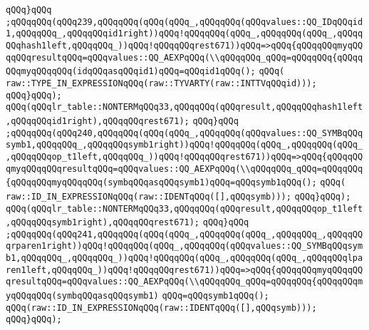\verb|qQQq}qQQq|\newline
\verb|;qQQqqQQq(qQQq239,qQQqqQQq(qQQq(qQQq_,qQQqqQQq(qQQqvalues::QQ_IDqQQqid1,qQQqqQQq_,qQQqqQQqid1right))qQQq!qQQqqQQq(qQQq_,qQQqqQQq(qQQq_,qQQqqQQqhash1left,qQQqqQQq_))qQQq!qQQqqQQqrest671))qQQq=>qQQq{qQQqqQQqmyqQQqqQQqresultqQQq=qQQqvalues::QQ_AEXPqQQq(\\qQQqqQQq_qQQq=qQQqqQQq{qQQqqQQqmyqQQqqQQq(idqQQqasqQQqid1)qQQq=qQQqid1qQQq();|\newline
\verb|qQQq(|\newline
\verb|raw::TYPE_IN_EXPRESSIONqQQq(raw::TYVARTY(raw::INTTVqQQqid)));|\newline
\verb|qQQq}qQQq);|\newline
\verb|qQQq(qQQqlr_table::NONTERMqQQq33,qQQqqQQq(qQQqresult,qQQqqQQqhash1left,qQQqqQQqid1right),qQQqqQQqrest671);|\newline
\verb|qQQq}qQQq|\newline
\verb|;qQQqqQQq(qQQq240,qQQqqQQq(qQQq(qQQq_,qQQqqQQq(qQQqvalues::QQ_SYMBqQQqsymb1,qQQqqQQq_,qQQqqQQqsymb1right))qQQq!qQQqqQQq(qQQq_,qQQqqQQq(qQQq_,qQQqqQQqop_t1left,qQQqqQQq_))qQQq!qQQqqQQqrest671))qQQq=>qQQq{qQQqqQQqmyqQQqqQQqresultqQQq=qQQqvalues::QQ_AEXPqQQq(\\qQQqqQQq_qQQq=qQQqqQQq{qQQqqQQqmyqQQqqQQq(symbqQQqasqQQqsymb1)qQQq=qQQqsymb1qQQq();|\newline
\verb|qQQq(|\newline
\verb|raw::ID_IN_EXPRESSIONqQQq(raw::IDENTqQQq([],qQQqsymb)));|\newline
\verb|qQQq}qQQq);|\newline
\verb|qQQq(qQQqlr_table::NONTERMqQQq33,qQQqqQQq(qQQqresult,qQQqqQQqop_t1left,qQQqqQQqsymb1right),qQQqqQQqrest671);|\newline
\verb|qQQq}qQQq|\newline
\verb|;qQQqqQQq(qQQq241,qQQqqQQq(qQQq(qQQq_,qQQqqQQq(qQQq_,qQQqqQQq_,qQQqqQQqrparen1right))qQQq!qQQqqQQq(qQQq_,qQQqqQQq(qQQqvalues::QQ_SYMBqQQqsymb1,qQQqqQQq_,qQQqqQQq_))qQQq!qQQqqQQq(qQQq_,qQQqqQQq(qQQq_,qQQqqQQqlparen1left,qQQqqQQq_))qQQq!qQQqqQQqrest671))qQQq=>qQQq{qQQqqQQqmyqQQqqQQqresultqQQq=qQQqvalues::QQ_AEXPqQQq(\\qQQqqQQq_qQQq=qQQqqQQq{qQQqqQQqmyqQQqqQQq(symbqQQqasqQQqsymb1)|\newline
\verb|qQQq=qQQqsymb1qQQq();|\newline
\verb|qQQq(raw::ID_IN_EXPRESSIONqQQq(raw::IDENTqQQq([],qQQqsymb)));|\newline
\verb|qQQq}qQQq);|\newline
